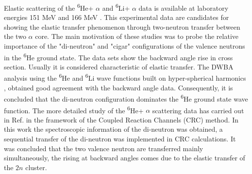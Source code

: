 \documentclass[
12pt, %
oneside, %
english, %
onehalfspacing, %
onehalfspacing, %
headsepline, %
]{MastersDoctoralThesis} %
\newcommand{\he}{\textsuperscript{6}He\xspace}
\newcommand{\li}{\textsuperscript{6}Li\xspace}
\begin{document}
Elastic scattering of the \he + $\alpha$  and \li + $\alpha$ data is available at laboratory energies 151 MeV and 166 MeV \cite{ter1998two, oganessian1999dynamics}. 
This experimental data are candidates for showing the elastic transfer phenomenon through two-neutron transfer between the two $\alpha$ core. The main motivation of these studies was to probe the relative importance of the "di-neutron" and "cigar" configurations of the valence neutrons in the \he ground state. 
The data sets show the backward angle rise in cross section.
Usually it is considered characteristic of elastic transfer. 
The DWBA analysis using the \he and \li wave functions built on hyper-spherical harmonics \cite{zhukov1993bound}, obtained good agreement with the backward angle data.
Consequently, it is concluded that the di-neutron configuration dominates the \he ground state wave function.
The more detailed study of the \he + $\alpha$ scattering data has carried out in Ref. \cite{khoa2004di} in the framework of the Coupled Reaction Channels (CRC) method. 
In this work the spectroscopic information of the di-neutron was obtained, a sequential transfer of the di-neutron was implemented in CRC calculations. It was concluded that the two valence neutron are transferred mainly simultaneously, the rising at backward angles comes due to the elastic transfer of the $2n$ cluster. 


\end{document}
